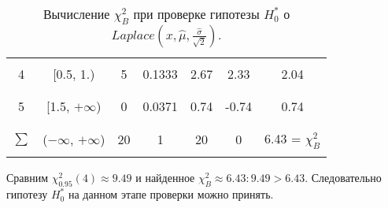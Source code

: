 \documentclass[../body.tex]{subfiles}
\begin{document}
\begin{enumerate}
\begin{table}[H]
\begin{tabular}{| c | c | c | c | c | c | c |}
		&  &  &  &  &  & \\\hline &  &  &  &  &  & \\
		4     & [0.5, 1.)                     &       5 &  0.1333 &     2.67 &           2.33 &                    2.04 \\
		&  &  &  &  &  & \\\hline &  &  &  &  &  & \\
		5     & [1.5, $+\infty$)            &       0 &  0.0371 &     0.74 &          -0.74 &                    0.74 \\
		&  &  &  &  &  & \\\hline &  &  &  &  &  & \\
		$\sum$  & ($-\infty$, $+\infty$)                          &      20 &  1      &    20    &           0    &                    6.43 = $\chi_B^2$ \\
		&  &  &  &  &  & \\\hline \hline
	\end{tabular}
	\caption{Вычисление $\chi_B^2$ при проверке гипотезы $H_0^*$ о $Laplace(x, \hat{\mu},\frac{\hat{\sigma}}{\sqrt2} )$.}
	\label{chi2_laplace}
\end{table}
Сравним $\chi_{0.95}^2(4) \approx 9.49$ и найденное  $\chi_B^2 \approx 6.43: 9.49 > 6.43.$ Следовательно гипотезу $H_0^*$ на данном этапе проверки можно принять.\\


\end{enumerate}
\end{document}
